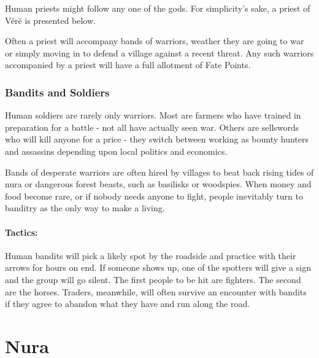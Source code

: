 \begin{multicols}{2}

\label{human_priest}

Human priests might follow any one of the gods.
For simplicity's sake, a priest of V\'{e}r\"{e} is presented below.


Often a priest will accompany bands of warriors, weather they are going to war or simply moving in to defend a village against a recent threat.
Any such warriors accompanied by a priest will have a full allotment of Fate Points.

\subsubsection{Bandits and Soldiers}\label{human_soldier}

Human soldiers are rarely only warriors.  Most are farmers who have trained in preparation for a battle - not all have actually seen war.  Others are sellswords who will kill anyone for a price - they switch between working as bounty hunters and assassins depending upon local politics and economics.

Bands of desperate warriors are often hired by villages to beat back rising tides of nura or dangerous forest beasts, such as basilisks or woodspies.
When money and food become rare, or if nobody needs anyone to fight, people inevitably turn to banditry as the only way to make a living.

\paragraph{Tactics:} Human bandits will pick a likely spot by the roadside and practice with their arrows for hours on end.
If someone shows up, one of the spotters will give a sign and the group will go silent.
The first people to be hit are fighters.
The second are the horses.
Traders, meanwhile, will often survive an encounter with bandits if they agree to abandon what they have and run along the road.



\vfill\null
\end{multicols}

\section{Nura}


